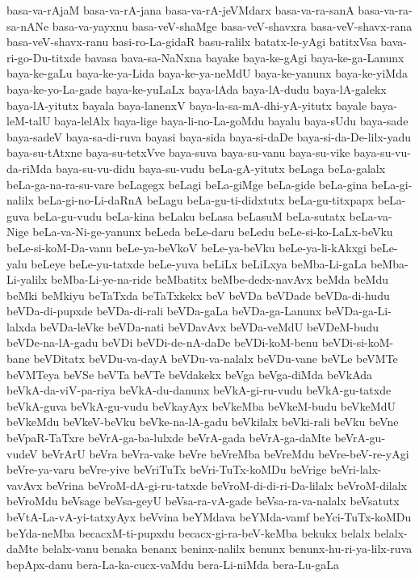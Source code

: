 {basa-va-rAjaM
basa-va-rA-jana
basa-va-rA-jeVMdarx
basa-va-ra-sanA
basa-va-ra-sa-nANe
basa-va-yayxnu
basa-veV-shaMge
basa-veV-shavxra
basa-veV-shavx-rana
basa-veV-shavx-ranu
basi-ro-La-gidaR
basu-ralilx
batatx-le-yAgi
batitxVsa
bava-ri-go-Du-titxde
bavasa
bava-sa-NaNxna
bayake
baya-ke-gAgi
baya-ke-ga-Lanunx
baya-ke-gaLu
baya-ke-ya-Lida
baya-ke-ya-neMdU
baya-ke-yanunx
baya-ke-yiMda
baya-ke-yo-La-gade
baya-ke-yuLaLx
baya-lAda
baya-lA-dudu
baya-lA-galekx
baya-lA-yitutx
bayala
baya-lanenxV
baya-la-sa-mA-dhi-yA-yitutx
bayale
baya-leM-talU
baya-lelAlx
baya-lige
baya-li-no-La-goMdu
bayalu
baya-sUdu
baya-sade
baya-sadeV
baya-sa-di-ruva
bayasi
baya-sida
baya-si-daDe
baya-si-da-De-lilx-yadu
baya-su-tAtxne
baya-su-tetxVve
baya-suva
baya-su-vanu
baya-su-vike
baya-su-vu-da-riMda
baya-su-vu-didu
baya-su-vudu
beLa-gA-yitutx
beLaga
beLa-galalx
beLa-ga-na-ra-su-vare
beLagegx
beLagi
beLa-giMge
beLa-gide
beLa-gina
beLa-gi-nalilx
beLa-gi-no-Li-daRnA
beLagu
beLa-gu-ti-didxtutx
beLa-gu-titxpapx
beLa-guva
beLa-gu-vudu
beLa-kina
beLaku
beLasa
beLasuM
beLa-sutatx
beLa-va-Nige
beLa-va-Ni-ge-yanunx
beLeda
beLe-daru
beLedu
beLe-si-ko-LaLx-beVku
beLe-si-koM-Da-vanu
beLe-ya-beVkoV
beLe-ya-beVku
beLe-ya-li-kAkxgi
beLe-yalu
beLeye
beLe-yu-tatxde
beLe-yuva
beLiLx
beLiLxya
beMba-Li-gaLa
beMba-Li-yalilx
beMba-Li-ye-na-ride
beMbatitx
beMbe-dedx-navAvx
beMda
beMdu
beMki
beMkiyu
beTaTxda
beTaTxkekx
beV
beVDa
beVDade
beVDa-di-hudu
beVDa-di-pupxde
beVDa-di-rali
beVDa-gaLa
beVDa-ga-Lanunx
beVDa-ga-Li-lalxda
beVDa-leVke
beVDa-nati
beVDavAvx
beVDa-veMdU
beVDeM-budu
beVDe-na-lA-gadu
beVDi
beVDi-de-nA-daDe
beVDi-koM-benu
beVDi-si-koM-bane
beVDitatx
beVDu-va-dayA
beVDu-va-nalalx
beVDu-vane
beVLe
beVMTe
beVMTeya
beVSe
beVTa
beVTe
beVdakekx
beVga
beVga-diMda
beVkAda
beVkA-da-viV-pa-riya
beVkA-du-danunx
beVkA-gi-ru-vudu
beVkA-gu-tatxde
beVkA-guva
beVkA-gu-vudu
beVkayAyx
beVkeMba
beVkeM-budu
beVkeMdU
beVkeMdu
beVkeV-beVku
beVke-na-lA-gadu
beVkilalx
beVki-rali
beVku
beVne
beVpaR-TaTxre
beVrA-ga-ba-lulxde
beVrA-gada
beVrA-ga-daMte
beVrA-gu-vudeV
beVrArU
beVra
beVra-vake
beVre
beVreMba
beVreMdu
beVre-beV-re-yAgi
beVre-ya-varu
beVre-yive
beVriTuTx
beVri-TuTx-koMDu
beVrige
beVri-lalx-vavAvx
beVrina
beVroM-dA-gi-ru-tatxde
beVroM-di-di-ri-Da-lilalx
beVroM-dilalx
beVroMdu
beVsage
beVsa-geyU
beVsa-ra-vA-gade
beVsa-ra-va-nalalx
beVsatutx
beVtA-La-vA-yi-tatxyAyx
beVvina
beYMdava
beYMda-vamf
beYci-TuTx-koMDu
beYda-neMba
becacxM-ti-pupxdu
becacx-gi-ra-beV-keMba
bekukx
belalx
belalx-daMte
belalx-vanu
benaka
benanx
beninx-nalilx
benunx
benunx-hu-ri-ya-lilx-ruva
bepApx-danu
bera-La-ka-cucx-vaMdu
bera-Li-niMda
bera-Lu-gaLa
}
